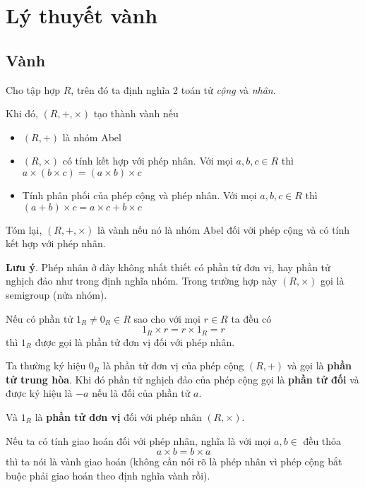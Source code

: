 \chapter{Lý thuyết vành}

\section{Vành}

\begin{definition}
    Cho tập hợp $R$, trên đó ta định nghĩa 2 toán tử \textit{cộng} và \textit{nhân}.

    Khi đó, $(R, +, \times)$ tạo thành vành nếu

    \begin{itemize}
        \item $(R, +)$ là nhóm Abel
        \item $(R, \times)$ có tính kết hợp với phép nhân. Với mọi $a, b, c \in R$ thì $a \times (b \times c) = (a \times b) \times c$
        \item Tính phân phối của phép cộng và phép nhân. Với mọi $a, b, c \in R$ thì $(a + b) \times c = a \times c + b \times c$
    \end{itemize}
\end{definition}

Tóm lại, $(R, +, \times)$ là vành nếu nó là nhóm Abel đối với phép cộng và có tính kết hợp với phép nhân.

\textbf{Lưu ý}. Phép nhân ở đây không nhất thiết có phần tử đơn vị, hay phần tử nghịch đảo như trong định nghĩa nhóm. Trong trường hợp này $(R, \times)$ gọi là semigroup (nửa nhóm).

\begin{definition} Nếu có phần tử $1_R \neq 0_R \in R$ sao cho với mọi $r \in R$ ta đều có
    \[1_R \times r = r \times 1_R = r\]
    thì $1_R$ được gọi là phần tử đơn vị đối với phép nhân.
\end{definition}

Ta thường ký hiệu $0_R$ là phần tử đơn vị của phép cộng $(R, +)$ và gọi là \textbf{phần tử trung hòa}.
Khi đó phần tử nghịch đảo của phép cộng gọi là \textbf{phần tử đối} và được ký hiệu là $-a$ nếu là đối của phần tử $a$.

Và $1_R$ là \textbf{phần tử đơn vị} đối với phép nhân $(R, \times)$.

\begin{definition}
    Nếu ta có tính giao hoán đối với phép nhân, nghĩa là với mọi $a, b \in $ đều thỏa
    \[a \times b = b \times a\]
    thì ta nói là vành giao hoán (không cần nói rõ là phép nhân vì phép cộng bắt buộc phải giao hoán theo định nghĩa vành rồi).
\end{definition}

